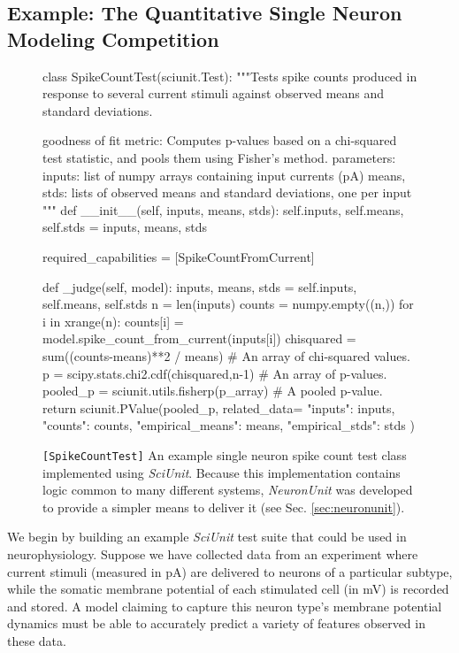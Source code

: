 \documentclass{frontiersSCNS}
\begin{document}
\subsection{Example: The Quantitative Single Neuron Modeling Competition}\label{sec:example}
\begin{figure}
\small
\begin{python}
class SpikeCountTest(sciunit.Test):
  """Tests spike counts produced in response to several current stimuli against observed means and standard deviations. 

  goodness of fit metric: Computes p-values based on a chi-squared test statistic, and pools them using Fisher's method.
  parameters:
    inputs: list of numpy arrays containing input currents (pA)
    means, stds: lists of observed means and standard deviations, one per input
  """
  def __init__(self, inputs, means, stds):
    self.inputs, self.means, self.stds = inputs, means, stds
	
  required_capabilities = [SpikeCountFromCurrent]
	
  def _judge(self, model):
    inputs, means, stds = self.inputs, self.means, self.stds
    n = len(inputs)
    counts = numpy.empty((n,))
    for i in xrange(n):
      counts[i] = model.spike_count_from_current(inputs[i])
    chisquared = sum((counts-means)**2 / means) # An array of chi-squared values.  
    p = scipy.stats.chi2.cdf(chisquared,n-1) # An array of p-values.  
    pooled_p = sciunit.utils.fisherp(p_array) # A pooled p-value.  
    return sciunit.PValue(pooled_p, related_data={
      "inputs": inputs, "counts": counts, "empirical_means": means, "empirical_stds": stds
      })
\end{python}
\vspace{-15px}
\caption{\texttt{[SpikeCountTest]} An example single neuron spike count test class implemented using \textit{SciUnit}. Because this implementation contains logic common to many different systems, \textit{NeuronUnit} was developed to provide a simpler means to deliver it (see Sec. \ref{sec:neuronunit}).}
\label{fig:rate_test}
\vspace{-10px}
\end{figure}

We begin by building an example \textit{SciUnit} test suite that could be used in neurophysiology. 
Suppose we have collected data from an experiment where current stimuli (measured in pA) are delivered to neurons of a particular subtype, while the somatic membrane potential of each stimulated cell (in mV) is recorded and stored.  
A model claiming to capture this neuron type's membrane potential dynamics must be able to accurately predict a variety of features observed in these data.
\end{document}
